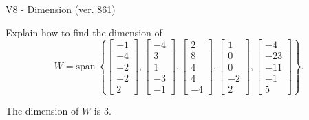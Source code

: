 \begin{exercise}
  \begin{exerciseTitle}V8 - Dimension (ver. 861)\end{exerciseTitle}
  \begin{exerciseStatement}
    Explain how to find the dimension of 
\[W=\mathrm{span}\ \left\{\left[\begin{array}{r}
-1 \\
-4 \\
-2 \\
-2 \\
2
\end{array}\right] , \left[\begin{array}{r}
-4 \\
3 \\
1 \\
-3 \\
-1
\end{array}\right] , \left[\begin{array}{r}
2 \\
8 \\
4 \\
4 \\
-4
\end{array}\right] , \left[\begin{array}{r}
1 \\
0 \\
0 \\
-2 \\
2
\end{array}\right] , \left[\begin{array}{r}
-4 \\
-23 \\
-11 \\
-1 \\
5
\end{array}\right]\right\}.\]



  \end{exerciseStatement}
  \begin{exerciseAnswer}
   The dimension of \(W\) is  \(3\).
  


  \end{exerciseAnswer}
\end{exercise}